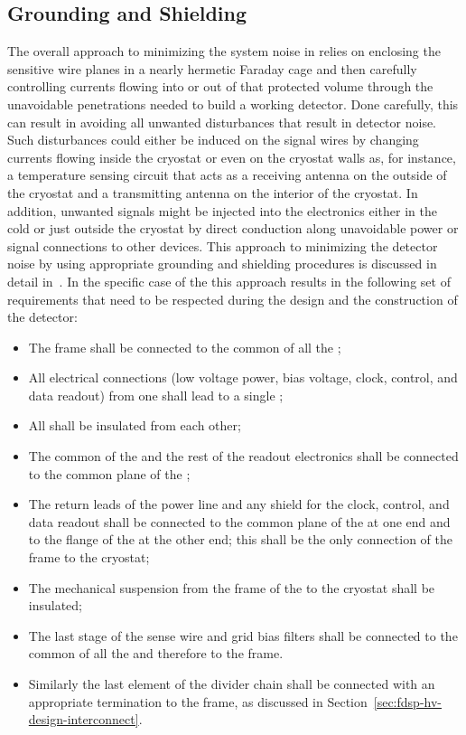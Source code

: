 \subsection{Grounding and Shielding}
\label{sec:fdsp-tpcelec-design-grounding}

The overall approach to minimizing the system noise in  
relies on enclosing the sensitive wire planes in a nearly hermetic 
Faraday cage and then carefully controlling currents flowing into or 
out of that protected volume through the unavoidable penetrations 
needed to build a working detector. Done carefully, this can result 
in avoiding all unwanted disturbances that result in detector noise. 
Such disturbances could either be induced on the signal wires by 
changing currents flowing inside the cryostat or even on the cryostat 
walls as, for instance, a temperature sensing circuit that acts as a 
receiving antenna on the outside of the cryostat and a transmitting 
antenna on the interior of the cryostat. In addition, unwanted signals 
might be injected into the electronics either in the cold or just 
outside the cryostat by direct conduction along unavoidable power 
or signal connections to other devices. This approach to minimizing
the detector noise by using appropriate grounding and shielding procedures
is discussed in detail in~\cite{radekaNoise}. In the specific case
of the   this approach results in the 
following set of requirements that need to be respected during the
design and the construction of the detector:
\begin{itemize}
\item{The  frame shall be connected to the common of
all the  ;}
\item{All electrical connections (low voltage power, bias voltage,
clock, control, and data readout) from one  shall lead to a 
single ;}
\item{All  shall be insulated from each other;}
\item{The common of the   and the rest of the 
 readout electronics shall be connected to
the common plane of the ;}
\item{The return leads of the  power line and any shield
for the clock, control, and data readout shall be connected
to the common plane of the  at one end and
to the flange of the  at the other end; this shall be 
the only connection of the  frame to the cryostat;}
\item{The mechanical suspension from the frame of the 
to the cryostat shall be insulated;}
\item{The last stage of the sense wire and grid bias filters shall be
connected to the common of all the   and therefore
to the  frame.}
\item{Similarly the last element of the  divider chain shall
be connected with an appropriate termination to the 
frame, as discussed in Section~\ref{sec:fdsp-hv-design-interconnect}.}
\end{itemize}

